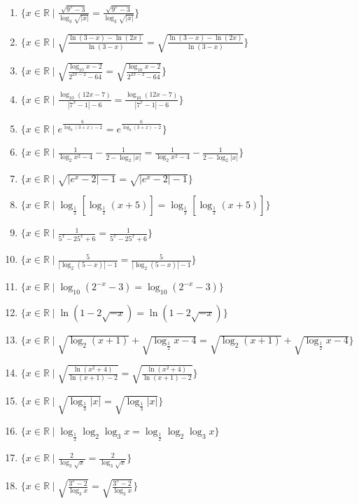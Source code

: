 \documentclass[11pt,a4paper]{article}
\begin{document}
\begin{enumerate}
\item $\displaystyle \{x \in \mathbb{R} \mid \frac{\sqrt{9^{x} - 3}}{\log_{3}\sqrt{\left| x \right|}} = \frac{\sqrt{9^{x} - 3}}{\log_{3}\sqrt{\left| x \right|}}\}$
\item $\displaystyle \{x \in \mathbb{R} \mid \sqrt{\frac{\ln(3 - x) - \ln(2x)}{\ln(3 - x)}} = \sqrt{\frac{\ln(3 - x) - \ln(2x)}{\ln(3 - x)}}\}$
\item $\displaystyle \{x \in \mathbb{R} \mid \sqrt{\frac{\log_{10} x - 2}{2^{2x-2} - 64}} = \sqrt{\frac{\log_{10} x - 2}{2^{2x-2} - 64}}\}$
\item $\displaystyle \{x \in \mathbb{R} \mid \frac{\log_{10}(12x - 7)}{\left| 7^{x} - 1 \right| - 6} = \frac{\log_{10}(12x - 7)}{\left| 7^{x} - 1 \right| - 6}\}$
\item $\displaystyle \{x \in \mathbb{R} \mid e^{\frac{6}{\log_{2}(3 + x) - 2}} = e^{\frac{6}{\log_{2}(3 + x) - 2}}\}$
\item $\displaystyle \{x \in \mathbb{R} \mid \frac{1}{\log_{2} x^{2} - 4} - \frac{1}{2 - \log_{2}\left| x \right|} = \frac{1}{\log_{2} x^{2} - 4} - \frac{1}{2 - \log_{2}\left| x \right|}\}$
\item $\displaystyle \{x \in \mathbb{R} \mid \sqrt{\left| e^{x} - 2 \right| - 1} = \sqrt{\left| e^{x} - 2 \right| - 1}\}$
\item $\displaystyle \{x \in \mathbb{R} \mid \log_{\frac{1}{2}}\left[\log_{\frac{1}{2}}(x + 5)\right] = \log_{\frac{1}{2}}\left[\log_{\frac{1}{2}}(x + 5)\right]\}$
\item $\displaystyle \{x \in \mathbb{R} \mid \frac{1}{5^{x} - 25^{x} + 6} = \frac{1}{5^{x} - 25^{x} + 6}\}$
\item $\displaystyle \{x \in \mathbb{R} \mid \frac{5}{\left| \log_{2}(5 - x) \right| - 1} = \frac{5}{\left| \log_{2}(5 - x) \right| - 1}\}$
\item $\displaystyle \{x \in \mathbb{R} \mid \log_{10}(2^{-x} - 3) = \log_{10}(2^{-x} - 3)\}$
\item $\displaystyle \{x \in \mathbb{R} \mid \ln(1 - 2\sqrt{-x}) = \ln(1 - 2\sqrt{-x})\}$
\item $\displaystyle \{x \in \mathbb{R} \mid \sqrt{\log_{2}(x + 1)} + \sqrt{\log_{\frac{1}{2}} x - 4} = \sqrt{\log_{2}(x + 1)} + \sqrt{\log_{\frac{1}{2}} x - 4}\}$
\item $\displaystyle \{x \in \mathbb{R} \mid \sqrt{\frac{\ln(x^{2} + 4)}{\ln(x + 1) - 2}} = \sqrt{\frac{\ln(x^{2} + 4)}{\ln(x + 1) - 2}}\}$
\item $\displaystyle \{x \in \mathbb{R} \mid \sqrt{\log_{\frac{1}{3}}\left| x \right|} = \sqrt{\log_{\frac{1}{3}}\left| x \right|}\}$
\item $\displaystyle \{x \in \mathbb{R} \mid \log_{\frac{1}{2}}\log_{2}\log_{3} x = \log_{\frac{1}{2}}\log_{2}\log_{3} x\}$
\item $\displaystyle \{x \in \mathbb{R} \mid \frac{2}{\log_{3}\sqrt{x}} = \frac{2}{\log_{3}\sqrt{x}}\}$
\item $\displaystyle \{x \in \mathbb{R} \mid \sqrt{\frac{3^{x} - 2}{\log_{3} x}} = \sqrt{\frac{3^{x} - 2}{\log_{3} x}}\}$
\end{enumerate}
\end{document}
